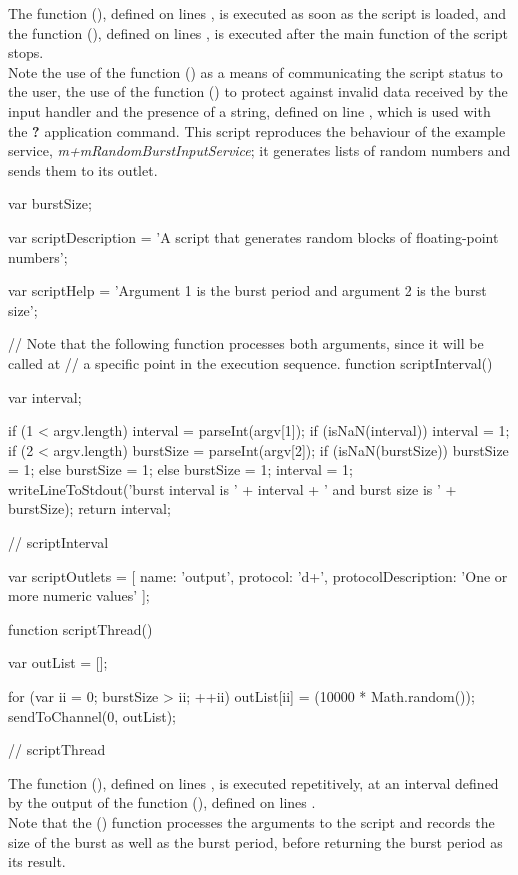 The function (), defined on lines \longDash{},
is executed as soon as the script is loaded, and the function (),
defined on lines \longDash{}, is executed after the main function of
the script stops.\\

Note the use of the function () as a means of communicating the
script status to the user, the use of the function () to protect
against invalid data received by the input handler and the presence of a
 string, defined on line , which is used with the \textbf{?}
application command.
\secondaryEnd
\condPage
{}
This script reproduces the behaviour of the example service,
\emph{m+mRandomBurstInputService}; it generates lists of random numbers and sends them to
its outlet.
\codeBegin
\begin{listing}[5]{1}
var burstSize;

var scriptDescription = 'A script that generates random blocks of floating-point numbers';

var scriptHelp = 'Argument 1 is the burst period and argument 2 is the burst size';

// Note that the following function processes both arguments, since it will be called at
// a specific point in the execution sequence.
function scriptInterval()
{
    var interval;
    
    if (1 < argv.length)
    {
        interval = parseInt(argv[1]);
        if (isNaN(interval))
        {
            interval = 1;
        }
        if (2 < argv.length)
        {
            burstSize = parseInt(argv[2]);
            if (isNaN(burstSize))
            {
                burstSize = 1;
            }
        }
        else
        {
            burstSize = 1;
        }
    }
    else
    {
        burstSize = 1;
        interval = 1;
    }
    writeLineToStdout('burst interval is ' + interval + ' and burst size is ' + burstSize);
    return interval;
} // scriptInterval

var scriptOutlets = [ { name: 'output', protocol: 'd+',
                        protocolDescription: 'One or more numeric values' } ];

function scriptThread()
{
    var outList = [];
    
    for (var ii = 0; burstSize > ii; ++ii)
    {
        outList[ii] = (10000 * Math.random());
    }
    sendToChannel(0, outList);
} // scriptThread
\end{listing}
\codeEnd{}
The function (), defined on lines \longDash{}, is
executed repetitively, at an interval defined by the output of the function
(), defined on lines \longDash{}.\\

Note that the () function processes the arguments to the script and
records the size of the burst as well as the burst period, before returning the burst
period as its result.
\secondaryEnd
\appendixEnd{}
